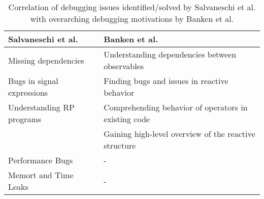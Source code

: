 \begin{table}
  \caption{Correlation of debugging issues identified/solved by Salvaneschi et al. with overarching debugging motivations by Banken et al.}

  \newcommand{\wrap}[1]{\parbox{.45\linewidth}{\vspace{1.5mm}#1\vspace{1mm}}}
  \begin{tabular}[t]{|l|l|}
  \hline
  \small{\bf{Salvaneschi et al.}}              & \small{\bf{Banken et al.}}                                           \\ \hline
  \small{\wrap{Missing dependencies}}          & \small{\wrap{Understanding dependencies between observables}}        \\ \hline
  \small{\wrap{Bugs in signal expressions}}    & \small{\wrap{Finding bugs and issues in reactive behavior}}          \\ \hline
  \small{\wrap{Understanding RP programs}}     & \small{\wrap{Comprehending behavior of operators in existing code}}  \\
                                               & \small{\wrap{Gaining high-level overview of the reactive structure}} \\ \hline
  \small{\wrap{Performance Bugs}}              & -                                                                    \\ \hline
  \small{\wrap{Memort and Time Leaks}}         & -                                                                    \\ \hline
  \end{tabular}
\end{table}
